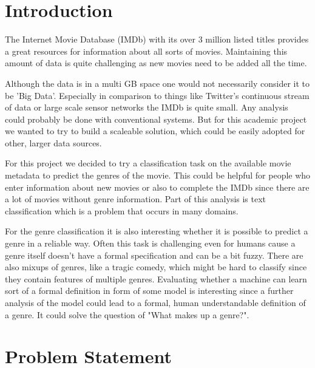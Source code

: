\documentclass{vldb}
\begin{document}
\section{Introduction}

\par The Internet Movie Database (IMDb) \cite{imdb} with its over 3 million listed titles provides a great resources for information about all sorts of movies. Maintaining this amount of data is quite challenging as new movies need to be added all the time.
\par Although the data is in a multi GB space one would not necessarily consider it to be 'Big Data'. Especially in comparison to things like Twitter's continuous stream of data or large scale sensor networks the IMDb is quite small. Any analysis could probably be done with conventional systems. But for this academic project we wanted to try to build a scaleable solution, which could be easily adopted for other, larger data sources.

\par For this project we decided to try a classification task on the available movie metadata to predict the genres of the movie. This could be helpful for people who enter information about new movies or also to complete the IMDb since there are a lot of movies without genre information.
Part of this analysis is text classification which is a problem that occurs in many domains.

\par For the genre classification it is also interesting whether it is possible to predict a genre in a reliable way. Often this task is challenging even for humans cause a genre itself doesn't have a formal specification and can be a bit fuzzy. There are also mixups of genres, like a tragic comedy, which might be hard to classify since they contain features of multiple genres. Evaluating whether a machine can learn sort of a formal definition in form of some model is interesting since a further analysis of the model could lead to a formal, human understandable definition of a genre. It could solve the question of "What makes up a genre?".



\section{Problem Statement}
\end{document}
